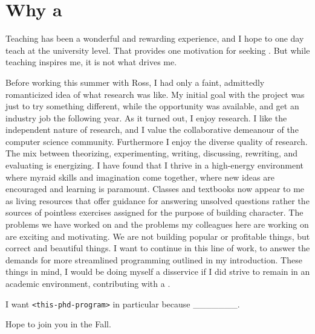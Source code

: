 \documentclass{article}
\begin{document}
\section{Why a \phd}
Teaching has been a wonderful and rewarding experience, and I hope to one day teach at the university level.
That provides one motivation for seeking \phd.
But while teaching inspires me, it is not what drives me.

Before working this summer with Ross, I had only a faint, admittedly romanticized idea of what research was like.
My initial goal with the project was just to try something different, while the opportunity was available, and get an industry job the following year.
As it turned out, I enjoy research. 
I like the independent nature of research, and I value the collaborative demeanour of the computer science community.
Furthermore I enjoy the diverse quality of research. 
The mix between theorizing, experimenting, writing, discussing, rewriting, and evaluating is energizing.
I have found that I thrive in a high-energy environment where myraid skills and imagination come together, where new ideas are encouraged and learning is paramount.
Classes and textbooks now appear to me as living resources that offer guidance for answering unsolved questions rather the sources of pointless exercises assigned for the purpose of building character.
The problems we have worked on and the problems my colleagues here are working on are exciting and motivating.
We are not building popular or profitable things, but correct and beautiful things.
I want to continue in this line of work, to answer the demands for more streamlined programming outlined in my introduction.
These things in mind, I would be doing myself a disservice if I did strive to remain in an academic environment, contributing with a \phd.

I want \texttt{<this-phd-program>} in particular because \_\_\_\_\_\_\_.

Hope to join you in the Fall.
\end{document}
